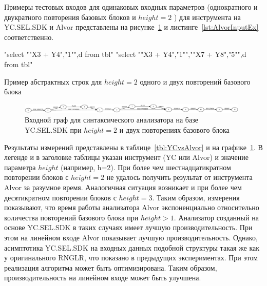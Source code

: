  
Примеры тестовых входов для одинаковых входных параметров (однократного и двукратного повторения базовых блоков и $height=2$ ) для инструмента на YC.SEL.SDK и Alvor представлены на рисунке~\ref{fig:YCInput} и листинге~\ref{lst:AlvorInputEx}  соответственно. 

\begin{listing}
    \begin{pyglist}[numbers=left,numbersep=5pt]
"select "{"X3 + Y4","1"}",d from tbl"
"select "{"X3 + Y4","1"}","{"X7 + Y8","5"}",d from tbl"
\end{pyglist}
\caption{Пример абстрактных строк для $height=2$ одного и двух повторений базового блока}
\label{lst:AlvorInputEx}
\end{listing}

\begin{figure}[h!]
 \centering
 \includegraphics[width=0.98\textwidth]{pics/ycSQLinput.eps}
 \caption{Входной граф для синтаксического анализатора на базе YC.SEL.SDK при $height=2$ и двух повторениях базового блока}
 \label{fig:YCInput}
\end{figure}

Результаты измерений представлены в таблице~\ref{tbl:YCvsAlvor} и на графике~\ref{fig:YCInput}. В легенде и в заголовке таблицы указан инструмент (YC или Alvor) и значение параметра $height$ (например, h=2). При более чем шестнадцатикратном повторении блоков с $height=2$ не удалось получить результат от инструмента Alvor за разумное время. Аналогичная ситуация возникает и при более чем десятикратном повторении блоков с $height=3$. Таким образом, измерения показывают, что время работы анализатора Alvor экспоненциально относительно количества повторений базового блока при $height>1$. Анализатор созданный на основе YC.SEL.SDK в таких случаях имеет лучшую производительность. При этом на линейном входе Alvor показывает лучшую производительность. Однако, асимптотика YC.SEL.SDK на входных данных подобной структуры такая же как у оригинального RNGLR, что показано в предыдущих экспериментах. При этом реализация алгоритма может быть оптимизирована. Таким образом, производительность на линейном входе может быть улучшена.

